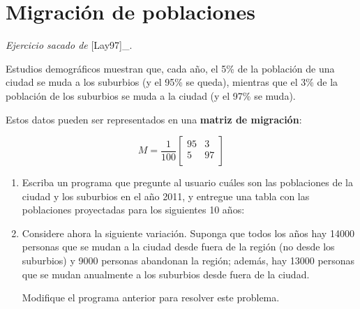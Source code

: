 \section{Migración de poblaciones}

\emph{Ejercicio sacado de} {[}Lay97{]}\_.

Estudios demográficos muestran que, cada año, el 5\% de la población de
una ciudad se muda a los suburbios (y el 95\% se queda), mientras que el
3\% de la población de los suburbios se muda a la ciudad (y el 97\% se
muda).

Estos datos pueden ser representados en una \textbf{matriz de
migración}:

\[M =
\frac{1}{100}
\begin{bmatrix}
95 &  3 \\
5 & 97 \\
\end{bmatrix}\]

\begin{enumerate}
\item
  Escriba un programa que pregunte al usuario cuáles son las poblaciones
  de la ciudad y los suburbios en el año 2011, y entregue una tabla con
  las poblaciones proyectadas para los siguientes 10 años:
\item
  Considere ahora la siguiente variación. Suponga que todos los años hay
  14000 personas que se mudan a la ciudad desde fuera de la región (no
  desde los suburbios) y 9000 personas abandonan la región; además, hay
  13000 personas que se mudan anualmente a los suburbios desde fuera de
  la ciudad.

  Modifique el programa anterior para resolver este problema.
\end{enumerate}
